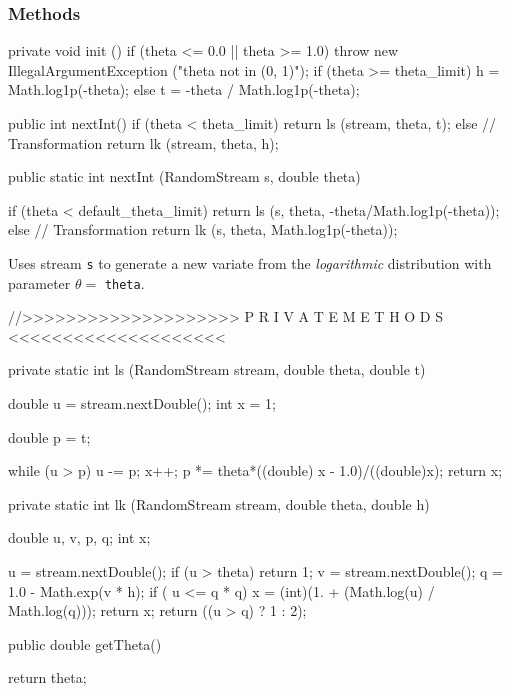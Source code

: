\subsubsection* {Methods}
\begin{code}\begin{hide}

   private void init () {
      if (theta <= 0.0 || theta >= 1.0)
         throw new IllegalArgumentException ("theta not in (0, 1)");
      if (theta >= theta_limit)
         h = Math.log1p(-theta);
      else
         t = -theta / Math.log1p(-theta);
   }

   public int nextInt() {
      if (theta < theta_limit)
         return ls (stream, theta, t);
      else   // Transformation
         return lk (stream, theta, h);
   }\end{hide}

   public static int nextInt (RandomStream s, double theta)\begin{hide} {
      if (theta < default_theta_limit)
         return ls (s, theta, -theta/Math.log1p(-theta));
      else   // Transformation
         return lk (s, theta, Math.log1p(-theta));
   }\end{hide}
\end{code}
\begin{tabb} Uses stream \texttt{s} to generate
   a new variate from the {\em logarithmic\/} distribution with parameter
 $\theta =$ \texttt{theta}.
\end{tabb}
\begin{code}\begin{hide}


//>>>>>>>>>>>>>>>>>>>>  P R I V A T E    M E T H O D S   <<<<<<<<<<<<<<<<<<<<


   private static int ls (RandomStream stream, double theta, double t) {
      double u = stream.nextDouble();
      int x = 1;

      double p =  t;

      while (u > p) {
            u -= p;
            x++;
            p *= theta*((double) x - 1.0)/((double)x);
      }
      return x;
   }

   private static int lk (RandomStream stream, double theta, double h) {
      double u, v, p, q;
      int x;

      u = stream.nextDouble();
      if (u > theta)
            return 1;
      v = stream.nextDouble();
      q = 1.0 - Math.exp(v * h);
      if ( u <= q * q) {
           x = (int)(1. + (Math.log(u) / Math.log(q)));
           return x;
      }
      return ((u > q) ? 1 : 2);
   }\end{hide}

   public double getTheta()\begin{hide} {
      return theta;
   }\end{hide}
\end{code}
